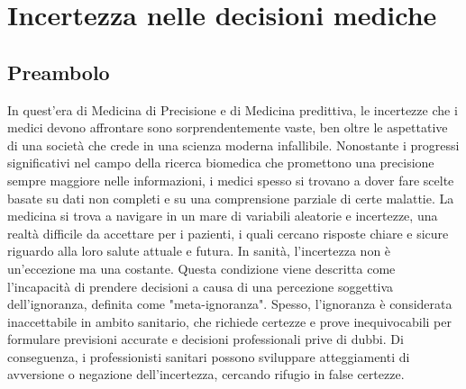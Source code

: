 \chapter{Incertezza nelle decisioni mediche}
\label{cap:incertezza-decisioni-mediche}


\section{Preambolo}
In quest'era di Medicina di Precisione e di Medicina predittiva, le incertezze che i medici devono affrontare sono sorprendentemente vaste, ben oltre le aspettative di una società che crede in una scienza moderna infallibile. Nonostante i progressi significativi nel campo della ricerca biomedica che promettono una precisione sempre maggiore nelle informazioni, i medici spesso si trovano a dover fare scelte basate su dati non completi e su una comprensione parziale di certe malattie. La medicina si trova a navigare in un mare di variabili aleatorie e incertezze, una realtà difficile da accettare per i pazienti, i quali cercano risposte chiare e sicure riguardo alla loro salute attuale e futura.
In sanità, l'incertezza non è un'eccezione ma una costante. Questa condizione viene descritta come l'incapacità di prendere decisioni a causa di una percezione soggettiva dell'ignoranza, definita come "meta-ignoranza". Spesso, l'ignoranza è considerata inaccettabile in ambito sanitario, che richiede certezze e prove inequivocabili per formulare previsioni accurate e decisioni professionali prive di dubbi. Di conseguenza, i professionisti sanitari possono sviluppare atteggiamenti di avversione o negazione dell'incertezza, cercando rifugio in false certezze.\\

